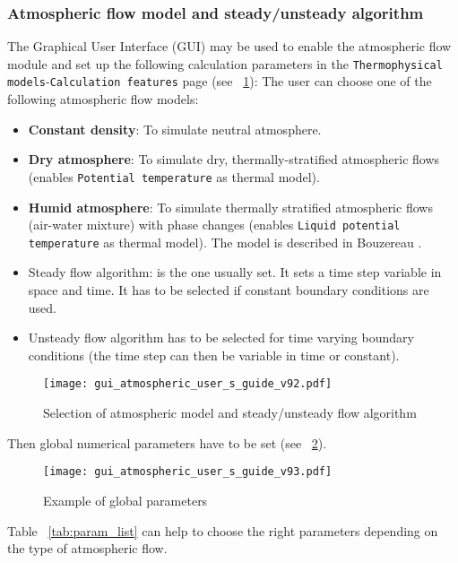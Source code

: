 {{\subsubsection{Atmospheric flow model and steady/unsteady algorithm}
%
The Graphical User Interface (GUI) may be used to enable the atmospheric flow
module and set up the following calculation parameters in the
\texttt{Thermophysical models}-\texttt{Calculation features} page
(see \figurename~\ref{fig:steady}):
%
%
The user can choose one of the following atmospheric flow models:
%
\begin{itemize}
\item \textbf{Constant density}: To simulate neutral atmosphere.
\item \textbf{Dry atmosphere}: To simulate dry, thermally-stratified
atmospheric flows (enables \texttt{Potential temperature} as thermal model).
\item \textbf{Humid atmosphere}: To simulate thermally stratified atmospheric
flows (air-water mixture) with phase changes (enables \texttt{Liquid potential
temperature} as thermal model). The model is described in
Bouzereau \cite{bouzereau}.
\end{itemize}
%
%
\begin{itemize}
\item Steady flow algorithm: is the one usually set. It sets a time step
variable in space and time. It has to be selected if constant boundary
conditions are used.
\item Unsteady flow algorithm has to be selected for time varying boundary
conditions (the time step can then be variable in time or constant).
\end{itemize}
%
\begin{figure}[ht]
\centerline{\texttt{[image: gui\_atmospheric\_user\_s\_guide\_v92.pdf]}}
\caption{Selection of atmospheric model and steady/unsteady flow algorithm}
\label{fig:steady}
\end{figure}
%
Then global numerical parameters have to be set
(see \figurename~\ref{fig:global}).
%
\begin{figure}[ht]
\centerline{\texttt{[image: gui\_atmospheric\_user\_s\_guide\_v93.pdf]}}
\caption{Example of global parameters }
\label{fig:global}
\end{figure}
%
Table \tablename~\ref{tab:param_list} can help to choose the right parameters
depending on the type of atmospheric flow.
%
}}
